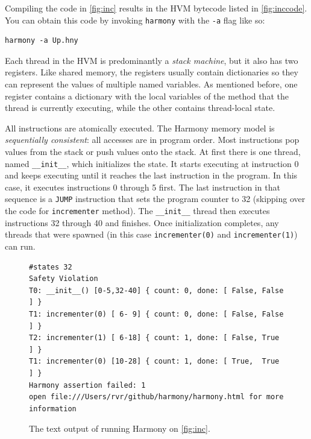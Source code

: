 \documentclass{report}
\newenvironment{code}{
\tcolorbox
}{
\endtcolorbox
}
\begin{document}
%

Compiling the code in \autoref{fig:inc} results in the HVM bytecode
listed in \autoref{fig:inccode}.
You can obtain this code by invoking \texttt{harmony} with the \texttt{-a} flag
like so:
\begin{code}
\begin{verbatim}
harmony -a Up.hny
\end{verbatim}
\end{code}
Each thread in the HVM is predominantly a \emph{stack machine},
%
but it also has two registers.
Like shared memory, the registers usually contain dictionaries so they
can represent the values of multiple named variables.
As mentioned before, one register contains a dictionary with the local
variables of the method that the thread is currently executing,
while the other contains thread-local state.

%
All instructions are atomically executed.
The Harmony memory model is \emph{sequentially consistent}: all
accesses are in program order.
Most instructions pop values from the stack or push values onto the stack.
At first there is one thread, named \texttt{\_\_init\_\_},
which initializes the state.
It starts executing at instruction 0 and keeps executing until
it reaches the last instruction in the program.
In this case, it executes instructions 0 through 5 first.
The last instruction in that sequence is a \texttt{JUMP}
instruction that sets the program counter to 32
(skipping over the code for \texttt{incrementer} method).
The \texttt{\_\_init\_\_} thread then executes instructions
32 through 40 and finishes.
Once initialization completes, any threads that were spawned
(in this case \texttt{incrementer(0)} and \texttt{incrementer(1)})
can run.

\begin{figure}
\begin{code}
\begin{verbatim}
#states 32
Safety Violation
T0: __init__() [0-5,32-40] { count: 0, done: [ False, False ] }
T1: incrementer(0) [ 6- 9] { count: 0, done: [ False, False ] }
T2: incrementer(1) [ 6-18] { count: 1, done: [ False, True  ] }
T1: incrementer(0) [10-28] { count: 1, done: [ True,  True  ] }
Harmony assertion failed: 1
open file:///Users/rvr/github/harmony/harmony.html for more information
\end{verbatim}
\end{code}
\caption{The text output of running Harmony on \autoref{fig:inc}.}
\label{fig:incoutput}
\end{figure}
\end{document}
